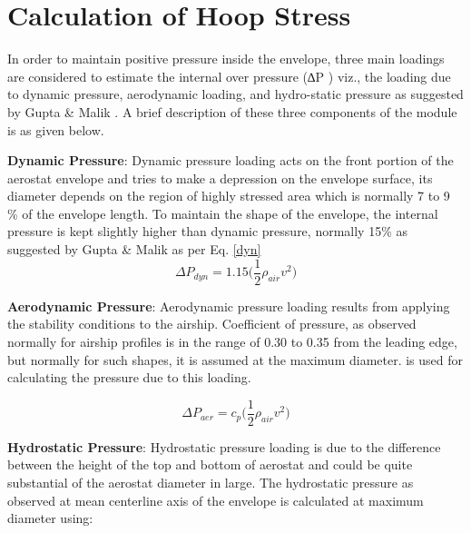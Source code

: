\chapter{Calculation of Hoop Stress}
\label{Hoop stress}

In order to maintain positive pressure inside the envelope, three main loadings are considered to estimate the internal over pressure (∆P ) viz., the loading due to dynamic pressure, aerodynamic loading, and hydro-static pressure as suggested by Gupta \& Malik \cite{gupta2002envelope} . A brief description of these three components of the module is as given below.

\textbf{Dynamic Pressure}: Dynamic pressure loading acts on the front portion of the aerostat envelope and tries to make a depression on the envelope surface, its diameter depends on the region of highly stressed area which is normally 7 to 9 \% of the envelope length. To maintain the shape of the envelope, the internal pressure is kept slightly higher than dynamic pressure, normally 15\% as suggested by Gupta \& Malik \cite{gupta2002envelope} as per Eq. \ref{dyn}
\begin{equation}
\label{dyn}
\Delta P_{dyn} = 1.15 \bigg( \frac{1}{2} \rho_{air} v^{2} \bigg)
\end{equation}

\textbf{Aerodynamic Pressure}: Aerodynamic pressure loading results from applying the stability conditions to the airship. Coefficient of pressure, as observed normally for airship profiles is in the range of 0.30 to 0.35 from the leading edge, but normally for such shapes, it is assumed at the maximum diameter. is used for calculating the pressure due to this loading.

\begin{equation}
\label{aer}
\Delta P_{aer} = c_{p} \bigg( \frac{1}{2} \rho_{air} v^{2} \bigg)
\end{equation}

\textbf{Hydrostatic Pressure}: Hydrostatic pressure loading is due to the difference between the height of the top and bottom of aerostat and could be quite substantial of the aerostat diameter in large. The hydrostatic pressure as observed at mean centerline axis of the envelope is calculated at maximum diameter using:

